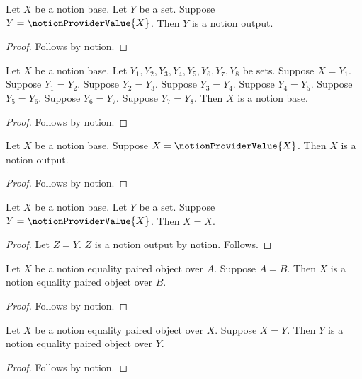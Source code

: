 \begin{proposition}\label{notion_equality_provider_boundary}
    Let $X$ be a notion base.
    Let $Y$ be a set.
    Suppose $Y=\notionProviderValue{X}$.
    Then $Y$ is a notion output.
\end{proposition}
\begin{proof}
    Follows by notion.
\end{proof}

\begin{proposition}\label{notion_equality_direct_prunes_graph}
    Let $X$ be a notion base.
    Let $Y_1,Y_2,Y_3,Y_4,Y_5,Y_6,Y_7,Y_8$ be sets.
    Suppose $X=Y_1$.
    Suppose $Y_1=Y_2$.
    Suppose $Y_2=Y_3$.
    Suppose $Y_3=Y_4$.
    Suppose $Y_4=Y_5$.
    Suppose $Y_5=Y_6$.
    Suppose $Y_6=Y_7$.
    Suppose $Y_7=Y_8$.
    Then $X$ is a notion base.
\end{proposition}
\begin{proof}
    Follows by notion.
\end{proof}

\begin{proposition}\label{notion_equality_same_denotation_endpoint}
    Let $X$ be a notion base.
    Suppose $X=\notionProviderValue{X}$.
    Then $X$ is a notion output.
\end{proposition}
\begin{proof}
    Follows by notion.
\end{proof}

\begin{proposition}\label{notion_equality_alias_provider_endpoint}
    Let $X$ be a notion base.
    Let $Y$ be a set.
    Suppose $Y=\notionProviderValue{X}$.
    Then $X=X$.
\end{proposition}
\begin{proof}
    Let $Z=Y$.
    $Z$ is a notion output by notion.
    Follows.
\end{proof}

\begin{proposition}\label{notion_equality_parameter}
    Let $X$ be a notion equality paired object over $A$.
    Suppose $A=B$.
    Then $X$ is a notion equality paired object over $B$.
\end{proposition}
\begin{proof}
    Follows by notion.
\end{proof}

\begin{proposition}\label{notion_equality_both_positions}
    Let $X$ be a notion equality paired object over $X$.
    Suppose $X=Y$.
    Then $Y$ is a notion equality paired object over $Y$.
\end{proposition}
\begin{proof}
    Follows by notion.
\end{proof}

